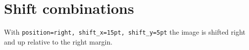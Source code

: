 \documentclass{article}
\begin{document}
\section*{Shift combinations}

With \texttt{position=right, shift\_x=15pt, shift\_y=5pt} the image is
shifted right and up relative to the right margin.

\lipsum[1-5]
\end{document}
